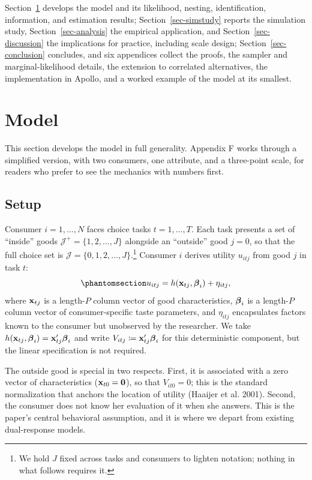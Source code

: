 \documentclass[
  letterpaper,
  DIV=11,
  numbers=noendperiod]{scrartcl}
\theoremstyle{plain}
\theoremstyle{plain}
\theoremstyle{plain}
\theoremstyle{remark}
\begin{document}
Section~\ref{sec-model} develops the model and its likelihood, nesting,
identification, information, and estimation results;
Section~\ref{sec-simstudy} reports the simulation study,
Section~\ref{sec-analysis} the empirical application, and
Section~\ref{sec-discussion} the implications for practice, including
scale design; Section~\ref{sec-conclusion} concludes, and six appendices
collect the proofs, the sampler and marginal-likelihood details, the
extension to correlated alternatives, the implementation in Apollo, and
a worked example of the model at its smallest.

\section{Model}\label{sec-model}

This section develops the model in full generality. Appendix F works
through a simplified version, with two consumers, one attribute, and a
three-point scale, for readers who prefer to see the mechanics with
numbers first.

\subsection{Setup}\label{setup}

Consumer \(i=1,\ldots,N\) faces choice tasks \(t=1,\ldots,T\). Each task
presents a set of ``inside'' goods
\(\mathcal{J}^{+} = \lbrace 1,2,\ldots,J \rbrace\) alongside an
``outside'' good \(j=0\), so that the full choice set is
\(\mathcal{J} = \lbrace 0,1,2,\ldots,J \rbrace\).\footnote{We hold \(J\)
  fixed across tasks and consumers to lighten notation; nothing in what
  follows requires it.} Consumer \(i\) derives utility \(u_{itj}\) from
good \(j\) in task \(t\):
\begin{equation}\protect\phantomsection\label{eq-utility}{
u_{itj} = h(\x_{tj}, \bfbeta_i) + \eta_{itj},
}\end{equation} where \(\mathbf{x}_{tj}\) is a length-\(P\) column vector of
good characteristics, \(\boldsymbol{\beta}_i\) is a length-\(P\) column vector of
consumer-specific taste parameters, and \(\eta_{itj}\) encapsulates
factors known to the consumer but unobserved by the researcher. We take
\(h(\mathbf{x}_{tj}, \boldsymbol{\beta}_i) = \mathbf{x}_{tj}'\boldsymbol{\beta}_i\) and write
\(V_{itj} \coloneqq \mathbf{x}_{tj}'\boldsymbol{\beta}_i\) for this deterministic
component, but the linear specification is not required.

The outside good is special in two respects. First, it is associated
with a zero vector of characteristics (\(\mathbf{x}_{t0} = \mathbf{0}\)), so
that \(V_{it0}=0\); this is the standard normalization that anchors the
location of utility (Haaijer et al. 2001). Second, the consumer does not
know her evaluation of it when she answers. This is the paper's central
behavioral assumption, and it is where we depart from existing
dual-response models.
\end{document}
